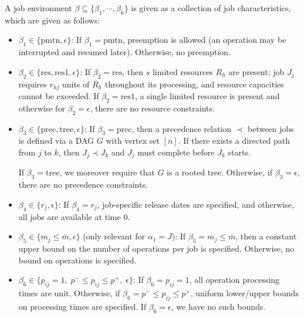 \begin{definition}
    A job environment $\beta \subseteq \{\beta_1,\cdots,\beta_6\}$ is given as a collection of job characteristics, which are given as follows:
    \begin{itemize}
        \item $\beta_1 \in \{\mathrm{pmtn}, \epsilon\}$: If $\beta_1=\mathrm{pmtn}$, preemption is allowed (an operation may be interrupted and resumed later). Otherwise, no preemption.

        \item $\beta_2 \in \{\mathrm{res}, \mathrm{res1}, \epsilon\}$: If $\beta_2=\mathrm{res}$, then $s$ limited resources $R_h$ are present; job $J_j$ requires $r_{hj}$ units of $R_h$ throughout its processing, and resource capacities cannot be exceeded. If $\beta_2=\mathrm{res1}$, a single limited resource is present and otherwise for $\beta_2=\epsilon$, there are no resource constraints.

        \item $\beta_3 \in \{\mathrm{prec}, \mathrm{tree}, \epsilon\}$: If $\beta_3=\mathrm{prec}$, then a precedence relation $\prec$ between jobs is defined via a DAG $G$ with vertex set $[n]$. If there exists a directed path from $j$ to $k$, then $J_j\prec J_k$ and $J_j$ must complete before $J_k$ starts.
        
        If $\beta_3=\mathrm{tree}$, we moreover require that $G$ is a rooted tree. Otherwise, if $\beta_3=\epsilon$, there are no precedence constraints.

        \item $\beta_4 \in \{r_j,\epsilon\}$: If $\beta_4=r_j$, job-specific release dates are specified, and otherwise, all jobs are available at time $0$.

        \item $\beta_5 \in \{m_j \le \bar{m},\epsilon\}$ (only relevant for $\alpha_1=J$): If $\beta_5=m_j \le \bar{m}$, then a constant upper bound on the number of operations per job is specified. Otherwise, no bound on operations is specified.
        
        \item $\beta_6 \in \{p_{ij}=1,\; p^- \le p_{ij} \le p^+,\; \epsilon\}$: If $\beta_6=p_{ij}=1$, all operation processing times are unit. Otherwise, if $\beta_6=p^- \le p_{ij} \le p^+$, uniform lower/upper bounds on processing times are specified. If $\beta_6=\epsilon$, we have no such bounds.
    \end{itemize}
\end{definition}

